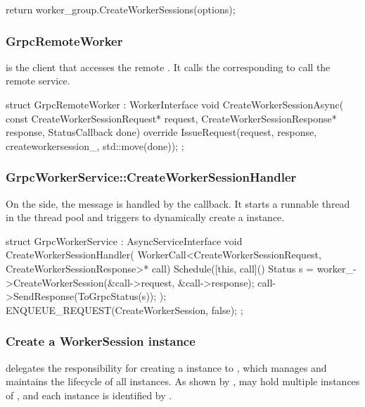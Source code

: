 \begin{content}
\begin{leftbar}
\begin{c++}
{  return worker_group.CreateWorkerSessions(options);
}
\end{c++}
\end{leftbar}


\subsubsection{GrpcRemoteWorker}
 is the  client that accesses the remote . It calls the corresponding  to call the remote service.

\begin{leftbar}
\begin{c++}
struct GrpcRemoteWorker : WorkerInterface {
  void CreateWorkerSessionAsync(
      const CreateWorkerSessionRequest* request,
      CreateWorkerSessionResponse* response,
      StatusCallback done) override {
    IssueRequest(request, response, createworkersession_, std::move(done));
  }
};
\end{c++}
\end{leftbar}


\subsubsection{GrpcWorkerService::CreateWorkerSessionHandler}
On the  side, the  message is handled by the  callback. It starts a runnable thread in the thread pool and triggers  to dynamically create a  instance.

\begin{leftbar}
\begin{c++}
struct GrpcWorkerService : AsyncServiceInterface {
  void CreateWorkerSessionHandler(
      WorkerCall<CreateWorkerSessionRequest, CreateWorkerSessionResponse>*
          call) {
    Schedule([this, call]() {
      Status s = worker_->CreateWorkerSession(&call->request, &call->response);
      call->SendResponse(ToGrpcStatus(s));
    });
    ENQUEUE_REQUEST(CreateWorkerSession, false);
  }
};
\end{c++}
\end{leftbar}


\subsubsection{Create a WorkerSession instance}
 delegates the responsibility for creating a  instance to , which manages and maintains the lifecycle of all  instances. As shown by ,  may hold multiple instances of , and each  instance is identified by .


\end{content}

